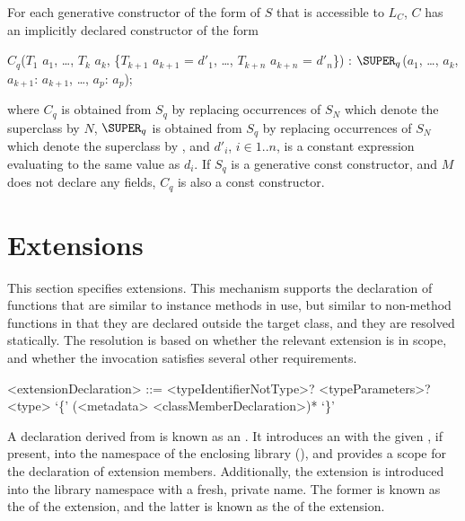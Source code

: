 \documentclass[makeidx]{article}
\begin{document}
\LMHash{}%
For each generative constructor of the form
of $S$ that is accessible to $L_C$, $C$ has
an implicitly declared constructor of the form

\begin{normativeDartCode}
$C_q$($T_{1}$ $a_{1}$, \ldots , $T_{k}$ $a_{k}$, \{$T_{k+1}$ $a_{k+1}$ = $d'_1$, \ldots , $T_{k+n}$ $a_{k+n}$ = $d'_n$\})
    : $\SUPER_q$($a_{1}$, \ldots , $a_{k}$, $a_{k+1}$: $a_{k+1}$, \ldots, $a_p$: $a_p$);
\end{normativeDartCode}

\noindent
where $C_q$ is obtained from $S_q$ by replacing occurrences of $S_N$
which denote the superclass by $N$,
$\SUPER_q$ is obtained from $S_q$ by replacing occurrences of $S_N$
which denote the superclass by \SUPER,
and $d'_i$, $i \in 1..n$, is a constant expression evaluating to
the same value as $d_i$.
If $S_q$ is a generative const constructor, and $M$ does not declare any
fields, $C_q$ is also a const constructor.


\section{Extensions}

\LMHash{}%
This section specifies extensions.
This mechanism supports the declaration of functions
that are similar to instance methods in use,
but similar to non-method functions in that
they are declared outside the target class,
and they are resolved statically.
The resolution is based on whether the relevant extension is in scope,
and whether the invocation satisfies several other requirements.

\begin{grammar}
<extensionDeclaration> ::= \gnewline{}
  \EXTENSION{} <typeIdentifierNotType>? <typeParameters>? \ON{} <type>
  \gnewline{} `\{' (<metadata> <classMemberDeclaration>)* `\}'
\end{grammar}

\LMHash{}%
A declaration derived from  is known as an
.
It introduces an
with the given , if present,
into the namespace of the enclosing library
(),
and provides a scope for the declaration of
extension members.
Additionally, the extension is introduced into the library namespace
with a fresh, private name.
The former is known as the
of the extension,
and the latter is known as the
of the extension.
\end{document}

